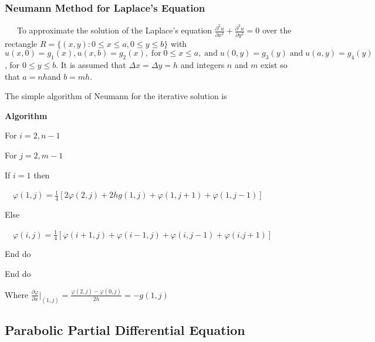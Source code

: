 \documentclass[a4paper]{article}
\newcommand{\tmop}[1]{\ensuremath{\operatorname{#1}}}
\newcommand{\tmtextbf}[1]{{\bfseries{#1}}}
\newcommand{\tmtextup}[1]{{\upshape{#1}}}
\newenvironment{tmindent}{\begin{tmparmod}{1.5em}{0pt}{0pt} }{\end{tmparmod}}
\newenvironment{tmparmod}[3]{\begin{list}{}{\setlength{\topsep}{0pt}\setlength{\leftmargin}{#1}\setlength{\rightmargin}{#2}\setlength{\parindent}{#3}\setlength{\listparindent}{\parindent}\setlength{\itemindent}{\parindent}\setlength{\parsep}{\parskip}} \item[]}{\end{list}}
\newenvironment{tmparsep}[1]{\begingroup\setlength{\parskip}{#1}}{\endgroup}
\begin{document}
\subsubsection{Neumann Method for Laplace's Equation}

\ \ \ To approximate the solution of the Laplace's equation $\frac{\partial^2
u}{\partial x^2} + \frac{\partial^2 u}{\partial y^2} = 0$ over the rectangle
$R =\{(x, y) : 0 \leqslant x \leqslant a, 0 \leqslant y \leqslant b\}$ with $u
(x, 0) = g_1 (x), u (x, b) = g_2 (x), \tmop{for} 0 \leqslant x \leqslant a,
\tmop{and} u (0, y) = g_3 (y) \tmop{and} u (a, y) = g_4 (y)$, for $0 \leqslant
y \leqslant b$. It is assumed that $\Delta x = \Delta y = h$ and integers $n$
and $m$ exist so that $a = n h$and $b = m h$.

The simple algorithm of Neumann for the iterative solution is

{\noindent}\begin{tmparsep}{0em}
  \tmtextbf{Algorithm \tmtextup{2}}{\smallskip}
  \begin{tmindent}
    For $i = 2, n - 1$

    For $j = 2, m - 1$

    If $i = 1$ then

    \ \ $\varphi \left( 1, j \right) = \frac{1}{4} \left[ 2 \varphi \left( 2,
    j \right) + 2 h g \left( 1, j \right) + \varphi \left( 1, j + 1 \right) +
    \varphi \left( 1, j - 1 \right) \right]$

    Else

    \ \ $\varphi \left( i, j \right) = \frac{1}{4} \left[ \varphi \left( i +
    1, j \right) + \varphi \left( i - 1, j \right) + \varphi \left( i, j - 1
    \right) + \varphi \left( i.j + 1 \right) \right]$

    End do

    End do
  \end{tmindent}
\end{tmparsep}{\hspace*{\fill}}{\medskip}

Where $\frac{\partial \varphi}{\partial x} |_{\left( 1, j \right)} =
\frac{\varphi \left( 2, j \right) - \varphi \left( 0, j \right)}{2 h} = - g
\left( 1, j \right)$







\subsection{Parabolic Partial Differential Equation}
\end{document}
